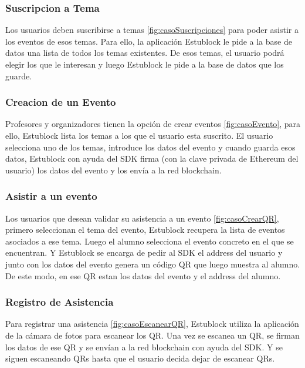 \subsubsection{Suscripcion a Tema}

Los usuarios deben suscribirse a temas \ref{fig:casoSuscripciones} para poder asistir a los eventos de esos temas. Para ello, la aplicación Estublock le pide a la base de datos una lista de todos los temas existentes. De esos temas, el usuario podrá elegir los que le interesan y luego Estublock le pide a la base de datos que los guarde.

\subsubsection{Creacion de un Evento}

Profesores y organizadores tienen la opción de crear eventos \ref{fig:casoEvento}, para ello, Estublock lista los temas a los que el usuario esta suscrito. El usuario selecciona uno de los temas, introduce los datos del evento y cuando guarda esos datos, Estublock con ayuda del SDK firma (con la clave privada de Ethereum del usuario) los datos del evento y los envía a la red blockchain.

\subsubsection{Asistir a un evento}

Los usuarios que desean validar su asistencia a un evento \ref{fig:casoCrearQR}, primero seleccionan el tema del evento, Estublock recupera la lista de eventos asociados a ese tema. Luego el alumno selecciona el evento concreto en el que se encuentran. Y Estublock se encarga de pedir al SDK el address del usuario y junto con los datos del evento genera un código QR que luego muestra al alumno. De este modo, en ese QR estan los datos del evento y el address del alumno. 

\subsubsection{Registro de Asistencia}

Para registrar una asistencia \ref{fig:casoEscanearQR}, Estublock utiliza la aplicación de la cámara de fotos para escanear los QR. Una vez se escanea un QR, se firman los datos de ese QR y se envían a la red blockchain con ayuda del SDK. Y se siguen escaneando QRs hasta que el usuario decida dejar de escanear QRs.

